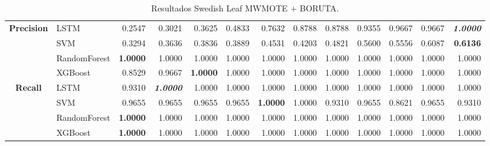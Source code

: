 \begin{table}[H]
\begin{adjustbox}{max width=12cm}
\begin{tabular}{|c|l|r|r|r|r|r|r|r|r|r|r|r|}
		\hline
		\textbf{Precision} &  LSTM &  0.2547 &  0.3021 &  0.3625 &  0.4833 &  0.7632 &  0.8788 &  0.8788 &  0.9355 &  0.9667 &  0.9667 & \textit{ \textbf{  1.0000 } } \\
		&  SVM &  0.3294 &  0.3636 &  0.3836 &  0.3889 &  0.4531 &  0.4203 &  0.4821 &  0.5600 &  0.5556 &  0.6087 & \textbf{  0.6136 } \\
		&  RandomForest & \textbf{  1.0000 } &  1.0000 &  1.0000 &  1.0000 &  1.0000 &  1.0000 &  1.0000 &  1.0000 &  1.0000 &  1.0000 &  1.0000 \\
		&  XGBoost &  0.8529 &  0.9667 & \textbf{  1.0000 } &  1.0000 &  1.0000 &  1.0000 &  1.0000 &  1.0000 &  1.0000 &  1.0000 &  1.0000 \\
		\hline
		\textbf{Recall} &  LSTM &  0.9310 & \textit{ \textbf{  1.0000 } } &  1.0000 &  1.0000 &  1.0000 &  1.0000 &  1.0000 &  1.0000 &  1.0000 &  1.0000 &  1.0000 \\
		&  SVM &  0.9655 &  0.9655 &  0.9655 &  0.9655 & \textbf{  1.0000 } &  1.0000 &  0.9310 &  0.9655 &  0.8621 &  0.9655 &  0.9310 \\
		&  RandomForest & \textbf{  1.0000 } &  1.0000 &  1.0000 &  1.0000 &  1.0000 &  1.0000 &  1.0000 &  1.0000 &  1.0000 &  1.0000 &  1.0000 \\
		&  XGBoost & \textbf{  1.0000 } &  1.0000 &  1.0000 &  1.0000 &  1.0000 &  1.0000 &  1.0000 &  1.0000 &  1.0000 &  1.0000 &  1.0000 \\
		\hline
	\end{tabular}
\end{adjustbox}
\caption{Resultados Swedish Leaf MWMOTE + BORUTA.}
\label{tab:SLeaf_MWMOTE_BORUTA}
\end{table}


